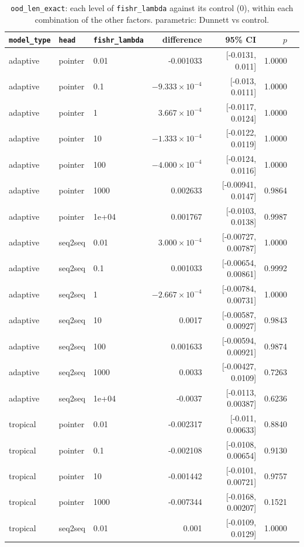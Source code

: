 \documentclass[10pt]{article}
\begin{document}
{\small
\begin{longtable}{lllrrrl}
\caption{\texttt{ood\_len\_exact}: each level of \texttt{fishr\_lambda} against its control (0), within each combination of the other factors. parametric: Dunnett vs control.}\label{tab:control-ood_len_exact}\\
\toprule
\texttt{model\_type} & \texttt{head} & \texttt{fishr\_lambda} & difference & 95\% CI & $p$ & \\
\midrule
\endhead
adaptive & pointer & 0.01 & -0.001033 & [-0.0131, 0.011] & 1.0000 & \\
adaptive & pointer & 0.1 & $-9.333\times10^{-4}$ & [-0.013, 0.0111] & 1.0000 & \\
adaptive & pointer & 1 & $3.667\times10^{-4}$ & [-0.0117, 0.0124] & 1.0000 & \\
adaptive & pointer & 10 & $-1.333\times10^{-4}$ & [-0.0122, 0.0119] & 1.0000 & \\
adaptive & pointer & 100 & $-4.000\times10^{-4}$ & [-0.0124, 0.0116] & 1.0000 & \\
adaptive & pointer & 1000 & 0.002633 & [-0.00941, 0.0147] & 0.9864 & \\
adaptive & pointer & 1e+04 & 0.001767 & [-0.0103, 0.0138] & 0.9987 & \\
adaptive & seq2seq & 0.01 & $3.000\times10^{-4}$ & [-0.00727, 0.00787] & 1.0000 & \\
adaptive & seq2seq & 0.1 & 0.001033 & [-0.00654, 0.00861] & 0.9992 & \\
adaptive & seq2seq & 1 & $-2.667\times10^{-4}$ & [-0.00784, 0.00731] & 1.0000 & \\
adaptive & seq2seq & 10 & 0.0017 & [-0.00587, 0.00927] & 0.9843 & \\
adaptive & seq2seq & 100 & 0.001633 & [-0.00594, 0.00921] & 0.9874 & \\
adaptive & seq2seq & 1000 & 0.0033 & [-0.00427, 0.0109] & 0.7263 & \\
adaptive & seq2seq & 1e+04 & -0.0037 & [-0.0113, 0.00387] & 0.6236 & \\
tropical & pointer & 0.01 & -0.002317 & [-0.011, 0.00633] & 0.8840 & \\
tropical & pointer & 0.1 & -0.002108 & [-0.0108, 0.00654] & 0.9130 & \\
tropical & pointer & 10 & -0.001442 & [-0.0101, 0.00721] & 0.9757 & \\
tropical & pointer & 1000 & -0.007344 & [-0.0168, 0.00207] & 0.1521 & \\
tropical & seq2seq & 0.01 & 0.001 & [-0.0109, 0.0129] & 1.0000 & \\

\end{longtable}}
\end{document}
